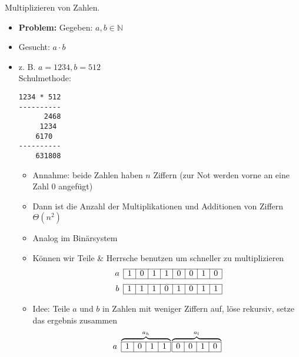 \Bsp Multiplizieren von Zahlen.
\begin{itemize}
\item   \textbf{Problem:} Gegeben: $a, b \in \mathbb N$
\item   Gesucht: $a \cdot b$
\item   z. B. $a = 1234, b = 512$\\
        Schulmethode:
        \begin{verbatim}
1234 * 512
----------
      2468
     1234
    6170  
----------
    631808\end{verbatim}
        \begin{itemize}
        \item   Annahme: beide Zahlen haben $n$ Ziffern (zur Not werden vorne an eine Zahl 0 angefügt)
        \item   Dann ist die Anzahl der Multiplikationen und Additionen von Ziffern $\Theta(n^2)$
        \item   Analog im Binärsystem
        \item   Können wir Teile \& Herrsche benutzen um schneller zu multiplizieren
                \[
                    \begin{array}{r|c|c|c|c|c|c|c|c|}
                    \cline{2-9}
                     a & 1 & 0 & 1 & 1 & 0 & 0 & 1 & 0 \\\cline{2-9}
                    \end{array}
                \]
                \[
                    \begin{array}{r|c|c|c|c|c|c|c|c|}
                    \cline{2-9}
                     b & 1 & 1 & 1 & 0 & 1 & 0 & 1 & 1 \\\cline{2-9}
                    \end{array}
                \]
        \item   Idee: Teile $a$ und $b$ in Zahlen mit weniger Ziffern auf, löse rekursiv, setze das ergebnis zusammen
                \[  a\ 
                    \overbrace{
                    \begin{array}{|c|c|c|c|}
                    \cline{1-4}
                     1 & 0 & 1 & 1 \\\cline{1-4}
                    \end{array}}^{a_h}
                    \overbrace{
                    \begin{array}{|c|c|c|c|}
                    \cline{1-4}
                     0 & 0 & 1 & 0 \\\cline{1-4}
                    \end{array}}^{a_l}
\]
\end{itemize}
\end{itemize}
